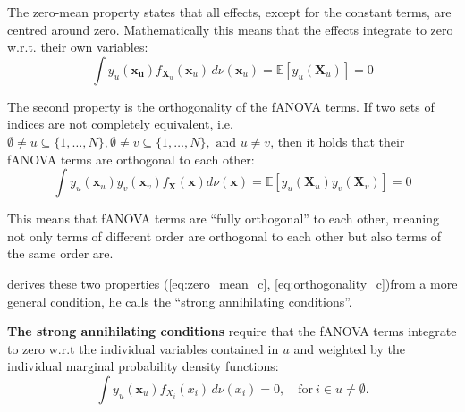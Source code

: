 \begin{proposition}
    The zero-mean property states that all effects, except for the constant terms, are centred around zero.
Mathematically this means that the effects integrate to zero w.r.t. their own variables:
\begin{equation}
    \int y_u(\boldsymbol{x_u}) f_{\boldsymbol{X}_u}(\boldsymbol{x}_u) \, d\nu (\boldsymbol{x}_u) = \mathbb{E}[y_u(\boldsymbol{X}_u)] = 0
    \label{eq:zero_mean_c}
\end{equation}
\end{proposition}
\begin{proposition}
    The second property is the orthogonality of the fANOVA terms. If two sets of indices are not completely equivalent, i.e. $\emptyset \neq u \subseteq \{1, \dots, N\}, \emptyset \neq v \subseteq \{1, \dots, N\}, \text{ and } u \neq v$, then it holds that their fANOVA terms are orthogonal to each other:
\begin{equation}
    \int y_u(\boldsymbol{x}_u) y_v(\boldsymbol{x}_v) f_{\boldsymbol{X}}(\boldsymbol{x}) d\nu (\boldsymbol{x}) = \mathbb{E}[y_u(\boldsymbol{X}_u) y_v(\boldsymbol{X}_v)] = 0
    \label{eq:orthogonality_c}
\end{equation}
\end{proposition}
This means that fANOVA terms are ``fully orthogonal'' to each other, meaning not only terms of different order are orthogonal to each other but also terms of the same order are.\par

\cite{rahman2014} derives these two properties (\autoref{eq:zero_mean_c}, \autoref{eq:orthogonality_c})from a more general condition, he calls the ``strong annihilating conditions''.\par
\textbf{The strong annihilating conditions} require that the fANOVA terms integrate to zero w.r.t the individual variables contained in $u$ and weighted by the individual marginal probability density functions:
\begin{equation}
    \int y_u(\boldsymbol{x}_u) f_{X_i}(x_i) \, d\nu(x_i) = 0, \quad \text{for} \ i \in u \neq \emptyset.
    \label{eq:strong_annihilating_conditions}
\end{equation}

